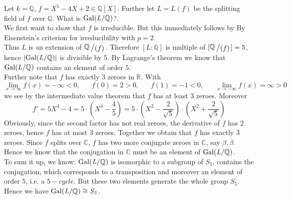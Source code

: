 \documentclass[11pt]{book}
\theoremstyle{nonumberbreak}
\newenvironment{ex}[1][]{\ifthenelse{\equal{#1}{}}{\example}{\example[#1]}\rm}{\endexample}
\newcommand{\slant}[2]{{\raisebox{.1em}{$#1$}\left/\raisebox{-.1em}{$#2$}\right.}}
\begin{document}
\begin{spacing}{1.3}
\begin{ex} %
Let $k=\mathbb{Q}$, $f= X^5-4X+2 \in \mathbb{Q}[X]$. Further let $L=L(f)$ be the splitting field of $f$ over $\mathbb{Q}$. What is $\rm{Gal}\it(L/\mathbb{Q})$?.\\
We first want to show that $f$ is irreducible. But this immediately follows by By Eisenstein's criterion for irreducibility with $p=2$.\\
Thus $L$ is an extension of $\slant{\mathbb{Q}}{( f )}$. Therefore $[L:\mathbb{Q}]$ is multiple of $[\slant{\mathbb{Q}}{( f )}]=5$, hence $\vert \rm{Gal}\it(L/\mathbb{Q}) \vert$ is divisible by $5$. By Lagrange's theorem we know that $\rm{Gal}\it(L/\mathbb{Q})$ contains an element of order $5$.\\
Further note that $f$ has exactly $3$ zeroes in $\mathbb{R}$.
With $$\lim_{x \to \infty} f(x)=- \infty <0, \quad \textrm{ }f(0)=2>0, \quad \textrm{ }f(1)=-1<0, \quad \textrm{ }\lim_{x \to - \infty} f(x)= \infty >0$$ we see by the intermediate value theorem that $f$ has at least $3$ zeroes.
Moreover $$f'=5X^4-4=5\cdot \left(X^4-\frac{4}{5}\right)=5 \cdot \left(X^2- \frac{2}{\sqrt{5}}\right) \cdot \left(X^2+ \frac{2}{\sqrt{5}}\right)$$Obviously, since the second factor has not real zeroes, the derivative of $f$ has $2$ zeroes, hence $f$ has at most $3$ zeroes. Together we obtain that $f$ has exactly $3$ zeroes. Since $f$ splits over $\mathbb{C}$, $f$ has two more conjugate zeroes in $\mathbb{C}$, say $\beta, \overline{\beta}$. Hence we know that the conjugation in $\mathbb{C}$ must be an element of $\rm{Gal}\it(L/\mathbb{Q})$.\\
To sum it up, we know: $\rm{Gal}\it(L/\mathbb{Q})$ is isomorphic to a subgroup of $S_5$, contains the conjugation, which corresponds to a transposition and moreover an element of order $5$, i.e. a $5-cycle$. But these two elements generate the whole group $S_5$. Hence we have
$\rm{Gal}\it(L/\mathbb{Q}) \cong S_5$.
\end{ex}


\end{spacing}
\end{document}
